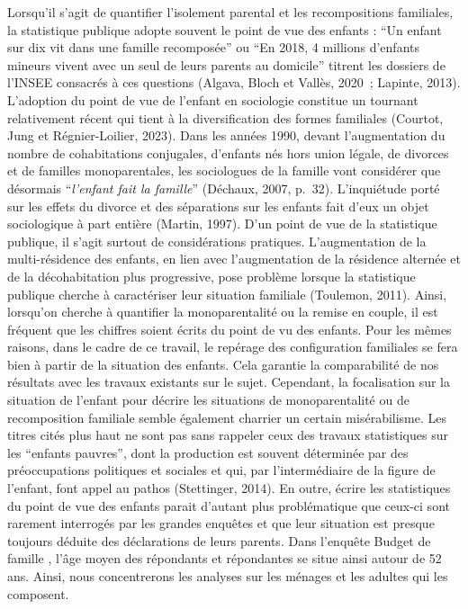 \documentclass[
  12pt,
]{book}
\begin{document}
Lorsqu'il s'agit de quantifier l'isolement parental et les
recompositions familiales, la statistique publique adopte souvent le
point de vue des enfants : ``Un enfant sur dix vit dans une famille
recomposée'' ou ``En 2018, 4 millions d'enfants mineurs vivent avec un
seul de leurs parents au domicile'' titrent les dossiers de l'INSEE
consacrés à ces questions (Algava, Bloch et Vallès, 2020~; Lapinte,
2013). L'adoption du point de vue de l'enfant en sociologie constitue un
tournant relativement récent qui tient à la diversification des formes
familiales (Courtot, Jung et Régnier-Loilier, 2023). Dans les années
1990, devant l'augmentation du nombre de cohabitations conjugales,
d'enfants nés hors union légale, de divorces et de familles
monoparentales, les sociologues de la famille vont considérer que
désormais ``\emph{l'enfant fait la famille}'' (Déchaux, 2007, p.~32).
L'inquiétude porté sur les effets du divorce et des séparations sur les
enfants fait d'eux un objet sociologique à part entière (Martin, 1997).
D'un point de vue de la statistique publique, il s'agit surtout de
considérations pratiques. L'augmentation de la multi-résidence des
enfants, en lien avec l'augmentation de la résidence alternée et de la
décohabitation plus progressive, pose problème lorsque la statistique
publique cherche à caractériser leur situation familiale (Toulemon,
2011). Ainsi, lorsqu'on cherche à quantifier la monoparentalité ou la
remise en couple, il est fréquent que les chiffres soient écrits du
point de vu des enfants. Pour les mêmes raisons, dans le cadre de ce
travail, le repérage des configuration familiales se fera bien à partir
de la situation des enfants. Cela garantie la comparabilité de nos
résultats avec les travaux existants sur le sujet. Cependant, la
focalisation sur la situation de l'enfant pour décrire les situations de
monoparentalité ou de recomposition familiale semble également charrier
un certain misérabilisme. Les titres cités plus haut ne sont pas sans
rappeler ceux des travaux statistiques sur les ``enfants pauvres'', dont
la production est souvent déterminée par des préoccupations politiques
et sociales et qui, par l'intermédiaire de la figure de l'enfant, font
appel au pathos (Stettinger, 2014). En outre, écrire les statistiques du
point de vue des enfants parait d'autant plus problématique que ceux-ci
sont rarement interrogés par les grandes enquêtes et que leur situation
est presque toujours déduite des déclarations de leurs parents. Dans
l'enquête Budget de famille , l'âge moyen des répondants et répondantes
se situe ainsi autour de 52 ans. Ainsi, nous concentrerons les analyses
sur les ménages et les adultes qui les composent.
\end{document}
